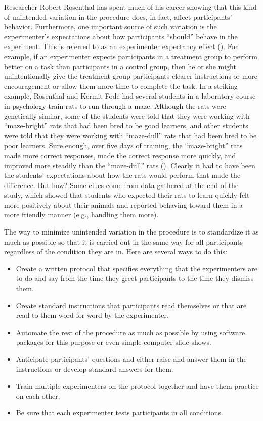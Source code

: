\documentclass[
]{krantz}
\providecommand{\tightlist}{%
  \setlength{\itemsep}{0pt}\setlength{\parskip}{0pt}}
\begin{document}
Researcher Robert Rosenthal has spent much of his career showing that this kind of unintended variation in the procedure does, in fact, affect participants' behavior. Furthermore, one important source of such variation is the experimenter's expectations about how participants ``should'' behave in the experiment. This is referred to as an experimenter expectancy effect (). For example, if an experimenter expects participants in a treatment group to perform better on a task than participants in a control group, then he or she might unintentionally give the treatment group participants clearer instructions or more encouragement or allow them more time to complete the task. In a striking example, Rosenthal and Kermit Fode had several students in a laboratory course in psychology train rats to run through a maze. Although the rats were genetically similar, some of the students were told that they were working with ``maze-bright'' rats that had been bred to be good learners, and other students were told that they were working with ``maze-dull'' rats that had been bred to be poor learners. Sure enough, over five days of training, the ``maze-bright'' rats made more correct responses, made the correct response more quickly, and improved more steadily than the ``maze-dull'' rats (). Clearly it had to have been the students' expectations about how the rats would perform that made the difference. But how? Some clues come from data gathered at the end of the study, which showed that students who expected their rats to learn quickly felt more positively about their animals and reported behaving toward them in a more friendly manner (e.g., handling them more).

The way to minimize unintended variation in the procedure is to standardize it as much as possible so that it is carried out in the same way for all participants regardless of the condition they are in. Here are several ways to do this:

\begin{itemize}
\tightlist
\item
  Create a written protocol that specifies everything that the experimenters are to do and say from the time they greet participants to the time they dismiss them.
\item
  Create standard instructions that participants read themselves or that are read to them word for word by the experimenter.
\item
  Automate the rest of the procedure as much as possible by using software packages for this purpose or even simple computer slide shows.
\item
  Anticipate participants' questions and either raise and answer them in the instructions or develop standard answers for them.
\item
  Train multiple experimenters on the protocol together and have them practice on each other.
\item
  Be sure that each experimenter tests participants in all conditions.
\end{itemize}
\end{document}
